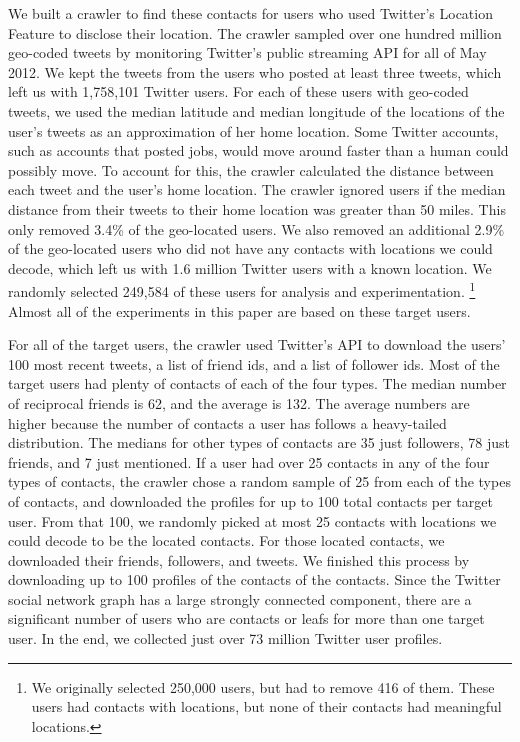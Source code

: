 We built a crawler to find these contacts for users who used Twitter's Location
Feature to disclose their location.
%
The crawler sampled over one hundred million geo-coded tweets by monitoring
Twitter's public streaming API for all of May 2012.
We kept the tweets from the users who posted at least three tweets, which left
us with 1,758,101 Twitter users.
%
For each of these users with geo-coded tweets, we used the median latitude and
median longitude of the locations of the user's tweets as an approximation of
her home location.
%
Some Twitter accounts, such as accounts that posted jobs, would
move around faster than a human could possibly move.
%
To account for this, the crawler calculated the distance between each tweet and
the user's home location.
%
The crawler ignored users if the median distance from their tweets to their
home location was greater than 50 miles.
%
This only removed 3.4\% of the geo-located users.
%
We also removed an additional 2.9\% of the geo-located users who did not have
any contacts with locations we could decode, which left us with 1.6 million
Twitter users with a known location.
%
We randomly selected 249,584 of these users for analysis and experimentation.
\ifdefined\THESIS
\footnote{We originally selected 250,000 users, but had to remove 416 of them.
These users had contacts with locations, but none of their contacts had
meaningful locations.}
\fi
%
Almost all of the experiments in this paper are based on these target
users.



For all of the target users, the crawler used Twitter's API to download
the users' 100 most recent tweets, a list of friend ids, and a list of follower ids.
%
Most of the target users had plenty of contacts of each of the four types.
%
The median number of reciprocal friends is 62, and the average is 132.
%
The average numbers are higher because the number of contacts a user has
follows a heavy-tailed distribution.
%
The medians for other types of contacts are 35 just followers, 78 just friends,
and 7 just mentioned.
%
If a user had over 25 contacts in any of the four types of contacts, the
crawler chose a random sample of 25 from each of the types of contacts, and
downloaded the profiles for up to 100 total contacts per target user.
%
From that 100, we randomly picked at most 25 contacts with locations we could
decode to be the located contacts. For those located contacts, we downloaded
their friends, followers, and tweets.
%
We finished this process by downloading up to 100 profiles of the contacts of
the contacts.
%
Since the Twitter social network graph has a large strongly connected
component, there are a significant number of users who are contacts or leafs for
more than one target user.
%
In the end, we collected just over 73 million Twitter user profiles.

